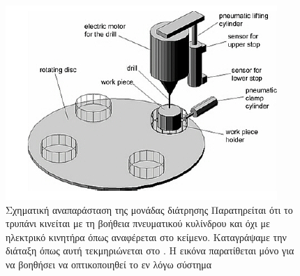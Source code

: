 \documentclass[a4paper,12pt,twoside]{report}
\begin{document}
				\begin{figure}[hp]
					\centering
					\includegraphics[scale=0.75]{ProcessingStationDrillingModuleThrambo.png}
					\caption{Σχηματική αναπαράσταση της μονάδας διάτρησης \cite{ΤοΦυσικόΣύστημαFestoMPS} {\footnotesize Παρατηρείται ότι το τρυπάνι κινείται με τη βοήθεια πνευματικού κυλίνδρου και όχι με ηλεκτρικό κινητήρα όπως αναφέρεται στο κείμενο. Καταγράψαμε την διάταξη όπως αυτή τεκμηριώνεται στο \cite{FestoMPSProcessingStationManual}. Η εικόνα παρατίθεται μόνο για να βοηθήσει να οπτικοποιηθεί το εν λόγω σύστημα}}
					\label{φωτ:Σχηματική αναπαράσταση της μονάδας διάτρησης από Θράμπο}
				\end{figure}
				
\end{document}
